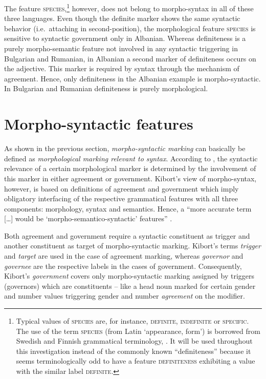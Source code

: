 The feature \textsc{species},\footnote{Typical values of \textsc{species} are, for instance, \textsc{definite, indefinite} or \textsc{specific}. The use of the term \textsc{species} (from Latin ‘appearance, form’) is borrowed from Swedish and Finnish grammatical terminology, \cite[cf., e.g.][]{holm-etal1970,itkonen-t1980a}. It will be used throughout this investigation instead of the commonly known “definiteness” because it seems terminologically odd to have a feature \textsc{definiteness} exhibiting a value with the similar label \textsc{definite}.} however, does not belong to morpho-syntax in all of these three languages. Even though the definite marker shows the same syntactic behavior (i.e.~attaching in second-position), the morphological feature \textsc{species} is sensitive to syntactic government only in Albanian. Whereas definiteness is a purely morpho-semantic feature not involved in any syntactic triggering in Bulgarian and Rumanian, in Albanian a second marker of definiteness occurs on the adjective. This marker is required by syntax through the mechanism of agreement. Hence, only definiteness in the Albanian example is morpho-syntactic. In Bulgarian and Rumanian definiteness is purely morphological.

\section{Morpho-syntactic features} \label{crit eval}
As shown in the previous section, \emph{morpho-syntactic marking} can basically be defined as \emph{morphological marking relevant to syntax}. According to \cite{kibort2008a}, the syntactic relevance of a certain morphological marker is determined by the involvement of this marker in either agreement or government. Kibort's view of morpho-syntax, however, is based on definitions of {agreement} and {government} which imply obligatory interfacing of the respective grammatical features with all three components: morphology, syntax and semantics. Hence, a “more accurate term [\dots] would be ‘morpho-semantico-syntactic’ features” \parencite{kibort2008a}. 

Both agreement and government require a syntactic constituent as trigger and another constituent as target of morpho-syntactic marking. Kibort's terms \emph{trigger} and \emph{target} are used in the case of agreement marking, whereas \emph{governor} and \emph{governee} are the respective labels in the cases of government. Consequently, Kibort's \emph{government} covers only morpho-syntactic marking assigned by triggers (governors) which are constituents – like a head noun marked for certain gender and number values triggering gender and number \emph{agreement} on the modifier.

